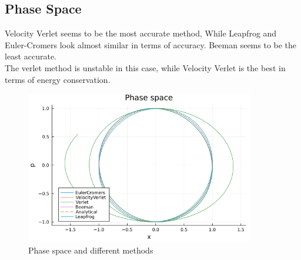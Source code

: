\documentclass[12pt,a4paper]{article}
\begin{document}
			\subsection*{Phase Space}
			Velocity Verlet seems to be the most accurate method, While Leapfrog and Euler-Cromers look almost similar in terms of accuracy. Beeman seems to be the least accurate. 
			\\
			The verlet method is unstable in this case, while Velocity Verlet is the best in terms of energy conservation.
			\begin{figure}[H]
				\centering
				\includegraphics[width=10cm]{phase.png}
				\caption{Phase space and different methods }
			\end{figure}
			
\end{document}
